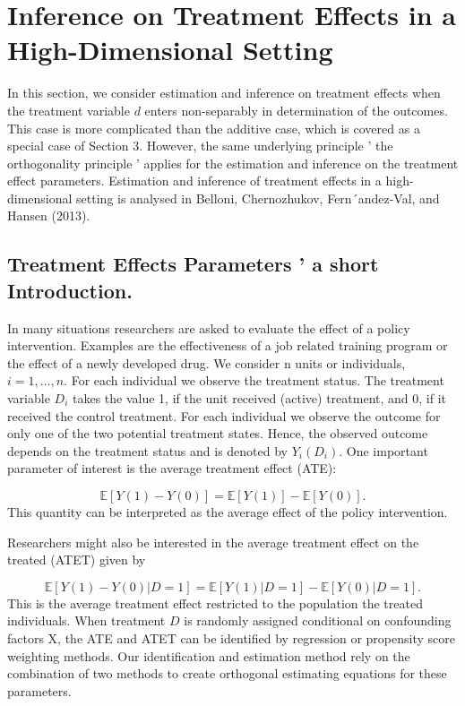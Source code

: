 \documentclass[12pt,a4paper]{article}
\begin{document}
\section{Inference on Treatment Effects in a High-Dimensional Setting}
In this section, we consider estimation and inference on treatment effects when the treatment variable $d$ enters non-separably in determination of the outcomes. This case is more complicated than the additive case, which is covered as a special case of Section 3. However, the same underlying principle ' the orthogonality principle ' applies for the estimation and inference on the treatment effect parameters. Estimation and inference of treatment effects in a high-dimensional setting is analysed in Belloni, Chernozhukov, Fern´andez-Val, and Hansen (2013).

\subsection{Treatment Effects Parameters ' a short Introduction.}
In many situations researchers are asked to evaluate the effect of a policy intervention. Examples are the effectiveness of a job related training program or the effect of a newly developed drug. We consider n units or individuals, $i = 1,\dots, n$. For each individual we observe the treatment status. The treatment variable $D_i$ takes the value 1, if the unit received (active) treatment, and 0, if it received the control treatment. For each individual we observe the outcome for only one of the two potential treatment states. Hence, the observed outcome depends on the treatment status and is denoted by $Y_i(D_i)$. One important parameter of interest is the average treatment effect (ATE):

\[
\mathbb E[Y(1) - Y(0)] = \mathbb E[Y(1)] - \mathbb E[Y(0)].
\]
This quantity can be interpreted as the average effect of the policy intervention.

Researchers might also be interested in the average treatment effect on the treated (ATET) given by

\[
\mathbb E[Y(1) - Y (0)|D = 1] = \mathbb E[Y(1)|D = 1] - \mathbb E[Y(0)|D = 1].
\]
This is the average treatment effect restricted to the population the treated individuals. When treatment $D$ is randomly assigned conditional on confounding factors X, the ATE and ATET can be identified by regression or propensity score weighting methods. Our identification and estimation method rely on the combination of two methods to create orthogonal estimating equations for these parameters.
\end{document}

